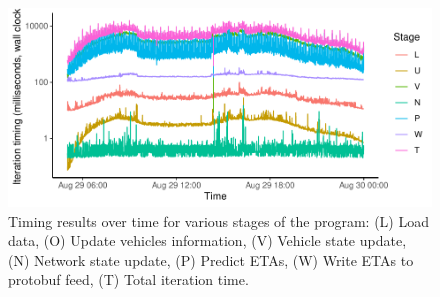 \begin{knitrout}\small
{}\color{fgcolor}\begin{figure}

{\centering \includegraphics[width=.8\textwidth]{figure/prediction_timing_time-1} 

}

\caption[Timing results over time for various stages of the program]{Timing results over time for various stages of the program: (L) Load data, (O) Update vehicles information, (V) Vehicle state update, (N) Network state update, (P) Predict ETAs, (W) Write ETAs to protobuf feed, (T) Total iteration time.}\label{fig:prediction_timing_time}
\end{figure}


\end{knitrout}
